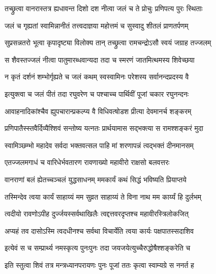 
\twolineshloka
{तच्छ्रुत्वा वानरास्तत्र ह्यधावन्त दिशो दश} 
{नीत्वा जलं च ते प्रोचुः प्रणिपत्य पुरः स्थिताः} %


\twolineshloka
{जलं च गृह्यतां स्वामिन्नानीतं तत्त्वदाज्ञया}
{महोत्तमं च सुस्वादु शीतलं प्राणतर्पणम्} %


\twolineshloka
{सुप्रसन्नतरो भूत्वा कृपादृष्ट्या विलोक्य तान् }
{तच्छ्रुत्वा रामचन्द्रोऽसौ स्वयं जग्राह तज्जलम्} %

\twolineshloka
{स शैवस्तज्जलं नीत्वा पातुमारब्धवान्यदा} 
{तदा च स्मरणं जातमित्थमस्य शिवेच्छया} %

\twolineshloka
{न कृतं दर्शनं शम्भोर्गृह्यते च जलं कथम्}
{स्वस्वामिनः परेशस्य सर्वानन्दप्रदस्य वै} %

\twolineshloka
{इत्युक्त्वा च जलं पीतं तदा रघुवरेण च}
{पश्चाच्च पार्थिवीं पूजां चकार रघुनन्दनः} %

\twolineshloka
{आवाहनादिकांश्चैव ह्युपचारान्प्रकल्प्य वै}
{विधिवत्षोडश प्रीत्या देवमानर्च शङ्करम्} %

\twolineshloka
{प्रणिपातैस्स्तवैर्दिव्यैश्शिवं सन्तोष्य यत्नतः}
{प्रार्थयामास सद्भक्त्या स रामश्शङ्करं मुदा} %


\twolineshloka
{स्वामिञ्छम्भो महादेव सर्वदा भक्तवत्सल} 
{पाहि मां शरणापन्नं त्वद्भक्तं दीनमानसम्} %

\twolineshloka
{एतज्जलमगाधं च वारिधेर्भवतारण}
{रावणाख्यो महावीरो राक्षसो बलवत्तरः} %

\twolineshloka
{वानराणां बलं ह्येतच्चञ्चलं युद्धसाधनम्}
{ममकार्यं कथं सिद्धं भविष्यति प्रियाप्तये} %

\twolineshloka
{तस्मिन्देव त्वया कार्यं साहाय्यं मम सुव्रत} 
{साहाय्यं ते विना नाथ मम कार्य्यं हि दुर्लभम्} %

\twolineshloka
{त्वदीयो रावणोऽपीह दुर्ज्जयस्सर्वथाखिलैः} 
{त्वद्दत्तवरदृप्तश्च महावीरस्त्रिलोकजित्} %

\twolineshloka
{अप्यहं तव दासोऽस्मि त्वदधीनश्च सर्वथा} 
{विचार्येति त्वया कार्यः पक्षपातस्सदाशिव} %


\twolineshloka
{इत्येवं स च सम्प्रार्थ्य नमस्कृत्य पुनःपुनः} 
{तदा जयजयेत्युच्चैरुद्धोषैश्शङ्करेति च} %

\twolineshloka
{इति स्तुत्वा शिवं तत्र मन्त्रध्यानपरायणः}
{पुनः पूजां ततः कृत्वा स्वाम्यग्रे स ननर्त ह} %

